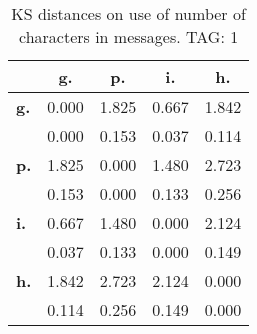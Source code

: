 \begin{table}[h!]
\begin{center}
\begin{tabular}{| l || c | c | c | c |}\hline
 & {\bf g.} & {\bf p.} & {\bf i.} & {\bf h.} \\\hline\hline
{\bf g.} & 0.000 & 1.825 & 0.667 & 1.842 \\
{\bf } & 0.000 & 0.153 & 0.037 & 0.114 \\\hline
{\bf p.} & 1.825 & 0.000 & 1.480 & 2.723 \\
{\bf } & 0.153 & 0.000 & 0.133 & 0.256 \\\hline
{\bf i.} & 0.667 & 1.480 & 0.000 & 2.124 \\
{\bf } & 0.037 & 0.133 & 0.000 & 0.149 \\\hline
{\bf h.} & 1.842 & 2.723 & 2.124 & 0.000 \\
{\bf } & 0.114 & 0.256 & 0.149 & 0.000 \\\hline
\end{tabular}
\caption{KS distances on use of number of characters in messages. TAG: 1}
\end{center}
\end{table}